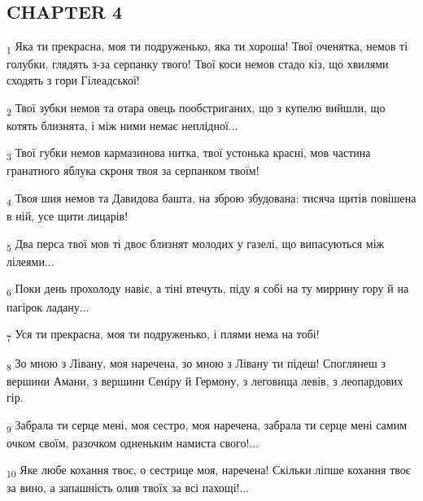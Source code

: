 \subsection{CHAPTER 4}
\begin{tcolorbox}
\textsubscript{1} Яка ти прекрасна, моя ти подруженько, яка ти хороша! Твої оченятка, немов ті голубки, глядять з-за серпанку твого! Твої коси немов стадо кіз, що хвилями сходять з гори Гілеадської!
\end{tcolorbox}
\begin{tcolorbox}
\textsubscript{2} Твої зубки немов та отара овець пообстриганих, що з купелю вийшли, що котять близнята, і між ними немає неплідної...
\end{tcolorbox}
\begin{tcolorbox}
\textsubscript{3} Твої губки немов кармазинова нитка, твої устонька красні, мов частина гранатного яблука скроня твоя за серпанком твоїм!
\end{tcolorbox}
\begin{tcolorbox}
\textsubscript{4} Твоя шия немов та Давидова башта, на зброю збудована: тисяча щитів повішена в ній, усе щити лицарів!
\end{tcolorbox}
\begin{tcolorbox}
\textsubscript{5} Два перса твої мов ті двоє близнят молодих у газелі, що випасуються між лілеями...
\end{tcolorbox}
\begin{tcolorbox}
\textsubscript{6} Поки день прохолоду навіє, а тіні втечуть, піду я собі на ту миррину гору й на пагірок ладану...
\end{tcolorbox}
\begin{tcolorbox}
\textsubscript{7} Уся ти прекрасна, моя ти подруженько, і плями нема на тобі!
\end{tcolorbox}
\begin{tcolorbox}
\textsubscript{8} Зо мною з Лівану, моя наречена, зо мною з Лівану ти підеш! Споглянеш з вершини Амани, з вершини Сеніру й Гермону, з леговища левів, з леопардових гір.
\end{tcolorbox}
\begin{tcolorbox}
\textsubscript{9} Забрала ти серце мені, моя сестро, моя наречена, забрала ти серце мені самим очком своїм, разочком одненьким намиста свого!...
\end{tcolorbox}
\begin{tcolorbox}
\textsubscript{10} Яке любе кохання твоє, о сестрице моя, наречена! Скільки ліпше кохання твоє за вино, а запашність олив твоїх за всі пахощі!...
\end{tcolorbox}
